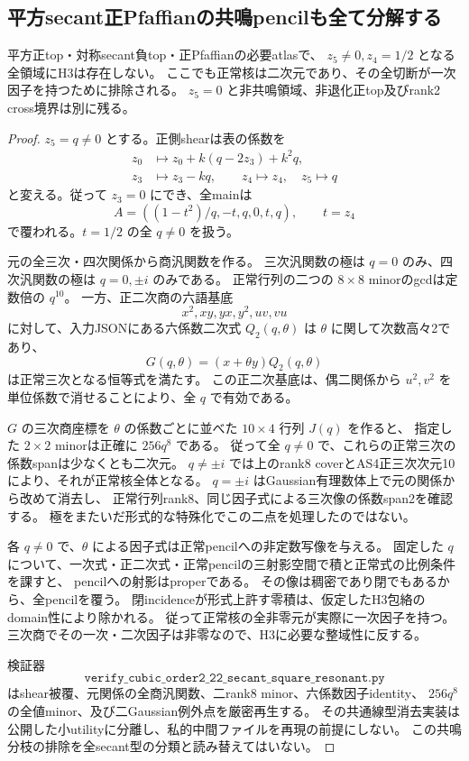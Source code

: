 \subsection{平方secant正Pfaffianの共鳴pencilも全て分解する}
\begin{theorem}\label{thm:h3-order2-22-secant-square-resonant-empty}
平方正top・対称secant負top・正Pfaffianの必要atlasで、
$z_5\ne0,z_4=1/2$ となる全領域にH3は存在しない。
ここでも正常核は二次元であり、その全切断が一次因子を持つために排除される。
$z_5=0$ と非共鳴領域、非退化正top及びrank2 cross境界は別に残る。
\end{theorem}
\begin{proof}
$z_5=q\ne0$ とする。正側shearは表の係数を
\[
\begin{aligned}
 z_0&\longmapsto z_0+k(q-2z_3)+k^2q,\\
 z_3&\longmapsto z_3-kq,\qquad z_4\longmapsto z_4,\quad z_5\longmapsto q
\end{aligned}
\]
と変える。従って $z_3=0$ にでき、全mainは
\[
 A=( (1-t^2)/q,-t,q,0,t,q),\qquad t=z_4
\]
で覆われる。$t=1/2$ の全 $q\ne0$ を扱う。

元の全三次・四次関係から商汎関数を作る。
三次汎関数の極は $q=0$ のみ、四次汎関数の極は $q=0,\pm i$ のみである。
正常行列の二つの $8\times8$ minorのgcdは定数倍の $q^{10}$。
一方、正二次商の六語基底
\[
 x^2,xy,yx,y^2,uv,vu
\]
に対して、入力JSONにある六係数二次式 $Q_2(q,\theta)$ は
$\theta$ に関して次数高々2であり、
\[
 G(q,\theta)=(x+\theta y)Q_2(q,\theta)
\]
は正常三次となる恒等式を満たす。
この正二次基底は、偶二関係から $u^2,v^2$ を単位係数で消せることにより、全 $q$ で有効である。

$G$ の三次商座標を $\theta$ の係数ごとに並べた $10\times4$ 行列 $J(q)$ を作ると、
指定した $2\times2$ minorは正確に $256q^8$ である。
従って全 $q\ne0$ で、これらの正常三次の係数spanは少なくとも二次元。
$q\ne\pm i$ では上のrank8 coverとAS4正三次次元10により、それが正常核全体となる。
$q=\pm i$ はGaussian有理数体上で元の関係から改めて消去し、
正常行列rank8、同じ因子式による三次像の係数span2を確認する。
極をまたいだ形式的な特殊化でこの二点を処理したのではない。

各 $q\ne0$ で、$\theta$ による因子式は正常pencilへの非定数写像を与える。
固定した $q$ について、一次式・正二次式・正常pencilの三射影空間で積と正常式の比例条件を課すと、
pencilへの射影はproperである。
その像は稠密であり閉でもあるから、全pencilを覆う。
閉incidenceが形式上許す零積は、仮定したH3包絡のdomain性により除かれる。
従って正常核の全非零元が実際に一次因子を持つ。
三次商でその一次・二次因子は非零なので、H3に必要な整域性に反する。

検証器
\[
\texttt{verify\_cubic\_order2\_22\_secant\_square\_resonant.py}
\]
はshear被覆、元関係の全商汎関数、二rank8 minor、六係数因子identity、
$256q^8$ の全値minor、及び二Gaussian例外点を厳密再生する。
その共通線型消去実装は公開した小utilityに分離し、私的中間ファイルを再現の前提にしない。
この共鳴分枝の排除を全secant型の分類と読み替えてはいない。
\end{proof}
